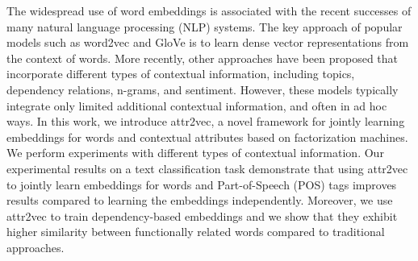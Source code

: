 The widespread use of word embeddings is associated with the recent successes of many natural language processing (NLP) systems. The key approach of popular models such as word2vec and GloVe is to learn dense vector representations from the context of words. More recently, other approaches have been proposed that incorporate different types of contextual information, including topics, dependency relations, n-grams, and sentiment. However, these models typically integrate only limited additional contextual information, and often in ad hoc ways. In this work, we introduce attr2vec, a novel framework for jointly learning embeddings for words and contextual attributes based on factorization machines. We perform experiments with different types of contextual information. Our experimental results on a text classification task demonstrate that using attr2vec to jointly learn embeddings for words and Part-of-Speech (POS) tags improves results compared to learning the embeddings independently. Moreover, we use attr2vec to train dependency-based embeddings and we show that they exhibit higher similarity between functionally related words compared to traditional approaches.
